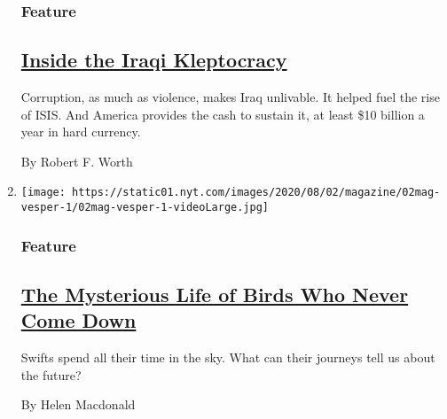 \begin{enumerate}
  \hypertarget{feature-1}{%
  \subsubsection{Feature}\label{feature-1}}

  \hypertarget{inside-the-iraqi-kleptocracy}{%
  \subsection{\texorpdfstring{\href{/2020/07/29/magazine/iraq-corruption.html}{Inside
  the Iraqi
  Kleptocracy}}{Inside the Iraqi Kleptocracy}}\label{inside-the-iraqi-kleptocracy}}

  Corruption, as much as violence, makes Iraq unlivable. It helped fuel
  the rise of ISIS. And America provides the cash to sustain it, at
  least \$10 billion a year in hard currency.

  By Robert F. Worth
\item
  \texttt{[image: https://static01.nyt.com/images/2020/08/02/magazine/02mag-vesper-1/02mag-vesper-1-videoLarge.jpg]}

  \hypertarget{feature-2}{%
  \subsubsection{Feature}\label{feature-2}}

  \hypertarget{the-mysterious-life-of-birds-who-never-come-down}{%
  \subsection{\texorpdfstring{\href{/2020/07/29/magazine/vesper-flights.html}{The
  Mysterious Life of Birds Who Never Come
  Down}}{The Mysterious Life of Birds Who Never Come Down}}\label{the-mysterious-life-of-birds-who-never-come-down}}

  Swifts spend all their time in the sky. What can their journeys tell
  us about the future?

  By Helen Macdonald
\end{enumerate}

